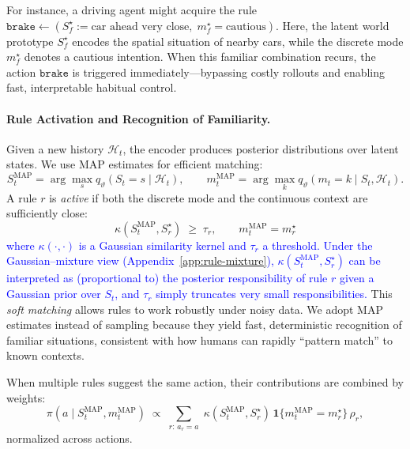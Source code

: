 \documentclass{article} %
\newcommand{\revise}[1]{\textcolor{blue}{#1}}
\begin{document}
For instance, a driving agent might acquire the rule
$
\texttt{brake} \gets (S_f^\star:= \text{car ahead very close}, \; m_f^\star = \text{cautious}).
$
Here, the latent world prototype $S_f^\star$ encodes the spatial situation of nearby cars, while the 
discrete mode $m_f^\star$ denotes a cautious intention. When this familiar combination recurs, the 
action $\texttt{brake}$ is triggered immediately—bypassing costly rollouts and enabling fast, interpretable 
habitual control.
\paragraph{Rule Activation and Recognition of Familiarity.}
Given a new history \(\mathcal H_t\), the encoder produces posterior distributions over latent states.  
We use MAP estimates for efficient matching:
{\small \[
S_t^{\text{MAP}}=\arg\max_s q_\vartheta(S_t=s\mid \mathcal H_t),\qquad
m_t^{\text{MAP}}=\arg\max_k q_\vartheta(m_t=k\mid S_t,\mathcal H_t).
\]}
A rule \(r\) is \emph{active} if both the discrete mode and the continuous context are sufficiently close:
\[
\kappa(S_t^{\text{MAP}}, S_r^\star)\; \ge \;\tau_r,\qquad
m_t^{\text{MAP}} = m_r^\star
\]
\revise{where \(\kappa(\cdot,\cdot)\) is a Gaussian similarity kernel and \(\tau_r\) a threshold. Under the Gaussian–mixture view (Appendix~\ref{app:rule-mixture}), \(\kappa(S_t^{\text{MAP}}, S_r^\star)\) can be interpreted as (proportional to) the posterior responsibility of rule \(r\) given a Gaussian prior over \(S_t\), and \(\tau_r\) simply truncates very small responsibilities.} This \emph{soft matching} allows rules to work robustly under noisy data. We adopt MAP estimates instead of sampling because they yield fast, deterministic recognition of familiar situations, consistent with how humans can rapidly “pattern match” to known contexts.

When multiple rules suggest the same action, their contributions are combined by weights:
{\small\[
\pi(a\mid S_t^{\mathrm{MAP}}, m_t^{\mathrm{MAP}})\;\propto\;
\sum_{r:\,a_r=a}\;\kappa(S_t^{\mathrm{MAP}},S_r^\star)\,\mathbf{1}\{m_t^{\mathrm{MAP}}=m_r^\star\}\,\rho_r,
\]}
normalized across actions.  
\end{document}
